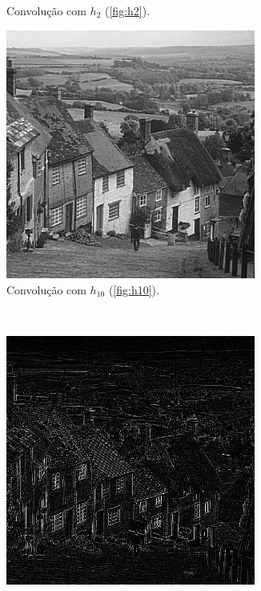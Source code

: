 \begin{figure}[H]
\begin{subfigure}{0.48\textwidth}
        \caption{Convolução com $h_2$ (\ref{fig:h2}).}
        \label{fig:sharpen:blur}
    \end{subfigure}%
    \begin{subfigure}{0.48\textwidth}
        \centering
        \includegraphics[width=0.9\textwidth]{resultados/city_h10.png}
        \caption{Convolução com $h_{10}$ (\ref{fig:h10}).}
        \label{fig:sharpen:sharpen}
    \end{subfigure}\\[8pt]
    \begin{subfigure}{0.48\textwidth}
        \centering
        \includegraphics[width=0.9\textwidth]{resultados/city_h5.png}

\end{subfigure}
\end{figure}

